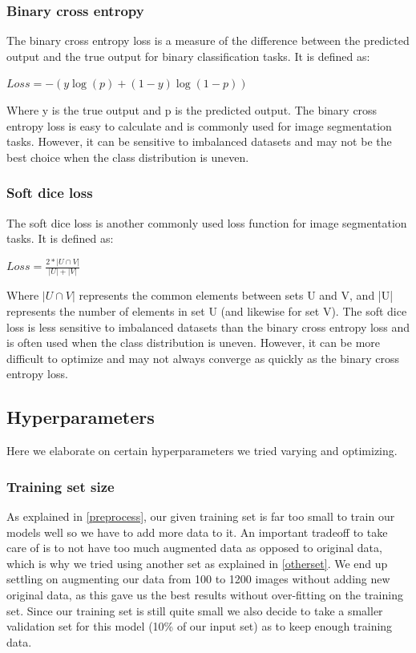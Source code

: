 \documentclass[10pt,conference,compsocconf]{IEEEtran}
\begin{document}
\subsubsection{Binary cross entropy}
The binary cross entropy loss is a measure of the difference between the predicted output and the true output for binary classification tasks. It is defined as:
\begin{center}
$Loss = -{(y\log(p) + (1 - y)\log(1 - p))}$
\end{center}

Where y is the true output and p is the predicted output. The binary cross entropy loss is easy to calculate and is commonly used for image segmentation tasks. However, it can be sensitive to imbalanced datasets and may not be the best choice when the class distribution is uneven.
\subsubsection{Soft dice loss}
The soft dice loss is another commonly used loss function for image segmentation tasks. It is defined as:
\begin{center}
$Loss = \frac{2*|U \cap V|}{|U| + |V|}$
\end{center}
Where ${|U \cap V|}$ represents the common elements between sets U and V, and |U| represents the number of elements in set U (and likewise for set V). The soft dice loss is less sensitive to imbalanced datasets than the binary cross entropy loss and is often used when the class distribution is uneven. However, it can be more difficult to optimize and may not always converge as quickly as the binary cross entropy loss.
\subsection{Hyperparameters}
Here we elaborate on certain hyperparameters we tried varying and optimizing.
\subsubsection{Training set size}
As explained in \ref{preprocess}, our given training set is far too small to train our models well so we have to add more data to it. An important tradeoff to take care of is to not have too much augmented data as opposed to original data, which is why we tried using another set as explained in \ref{otherset}. We end up settling on augmenting our data from 100 to 1200 images without adding new original data, as this gave us the best results without over-fitting on the training set.\newline
Since our training set is still quite small we also decide to take a smaller validation set for this model (10\% of our input set) as to keep enough training data.
\end{document}
